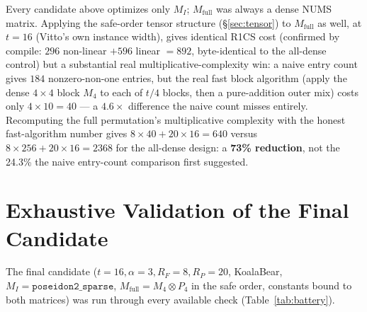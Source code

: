 \documentclass[11pt]{article}
\newcommand{\MI}{M_{I}}
\newcommand{\Mfull}{M_{\mathrm{full}}}
\begin{document}
Every candidate above optimizes only $\MI$; $\Mfull$ was always a dense
NUMS matrix. Applying the safe-order tensor structure
(\S\ref{sec:tensor}) to $\Mfull$ as well, at $t=16$ (Vitto's own instance
width), gives identical R1CS cost (confirmed by compile: $296$ non-linear
$+ 596$ linear $= 892$, byte-identical to the all-dense control) but a
substantial real multiplicative-complexity win: a naive entry count gives
$184$ nonzero-non-one entries, but the real fast block algorithm (apply
the dense $4\times4$ block $M_4$ to each of $t/4$ blocks, then a
pure-addition outer mix) costs only $4\times 10=40$ --- a $4.6\times$
difference the naive count misses entirely. Recomputing the full
permutation's multiplicative complexity with the honest fast-algorithm
number gives $8\times 40 + 20\times 16 = 640$ versus $8\times 256 +
20\times 16 = 2368$ for the all-dense design: a \textbf{73\% reduction},
not the 24.3\% the naive entry-count comparison first suggested.

\section{Exhaustive Validation of the Final Candidate}
\label{sec:battery}

The final candidate ($t=16,\alpha=3,R_F=8,R_P=20$, KoalaBear,
$\MI=\texttt{poseidon2\_sparse}$, $\Mfull = M_4\otimes P_4$ in the safe
order, constants bound to both matrices) was run through every available
check (Table~\ref{tab:battery}).
\end{document}
